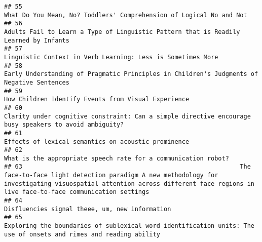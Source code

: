 \documentclass[
  english,
  man]{apa6}
\begin{document}
\begin{verbatim}
## 55                                                                                                                                                                       What Do You Mean, No? Toddlers' Comprehension of Logical No and Not
## 56                                                                                                                                                      Adults Fail to Learn a Type of Linguistic Pattern that is Readily Learned by Infants
## 57                                                                                                                                                                               Linguistic Context in Verb Learning: Less is Sometimes More
## 58                                                                                                                                                 Early Understanding of Pragmatic Principles in Children's Judgments of Negative Sentences
## 59                                                                                                                                                                                       How Children Identify Events from Visual Experience
## 60                                                                                                                                    Clarity under cognitive constraint: Can a simple directive encourage busy speakers to avoid ambiguity?
## 61                                                                                                                                                                                       Effects of lexical semantics on acoustic prominence
## 62                                                                                                                                                                            What is the appropriate speech rate for a communication robot?
## 63                                                            The face-to-face light detection paradigm A new methodology for investigating visuospatial attention across different face regions in live face-to-face communication settings
## 64                                                                                                                                                                                            Disfluencies signal theee, um, new information
## 65                                                                                                                         Exploring the boundaries of sublexical word identification units: The use of onsets and rimes and reading ability

\end{verbatim}
\end{document}
